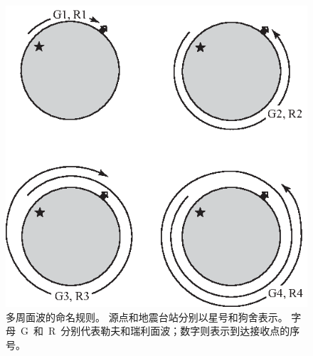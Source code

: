 \begin{figure}
\begin{center}
\includegraphics{../figures/chap11/fig03.eps}
\end{center}
\caption[G&Rorbits]{\label{11.fig.orbits}
多周面波的命名规则。
源点和地震台站分别以星号和狗舍表示。
字母~G~和~R~分别代表勒夫和瑞利面波；数字则表示到达接收点的序号。}
\end{figure}

